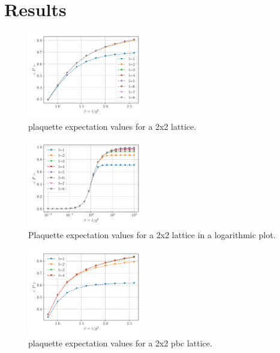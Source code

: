 \section{Results}
\begin{figure}[h]
	\begin{center}
		\includegraphics[width=0.45\textwidth]{images/PlaquetteExp2x2.pdf}
	\end{center}
	\caption{plaquette expectation values for a 2x2 lattice.}
\end{figure}
\begin{figure}[h]
	\begin{center}
		\includegraphics[width=0.45\textwidth]{images/PlaquetteExp2x2Log.pdf}
	\end{center}
	\caption{Plaquette expectation values for a 2x2 lattice in a logarithmic plot.}
\end{figure}
\begin{figure}[h]
	\begin{center}
		\includegraphics[width=0.45\textwidth]{images/PlaquetteExp2x2PBC.pdf}
	\end{center}
	\caption{plaquette expectation values for a 2x2 pbc lattice.}
\end{figure}
